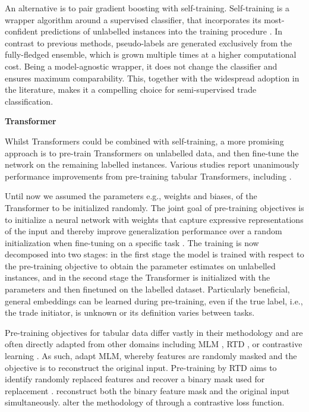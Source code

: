 An alternative is to pair gradient boosting with self-training. Self-training is a wrapper algorithm around a supervised classifier, that incorporates its most-confident predictions of unlabelled instances into the training procedure \autocite[][190]{yarowskyUnsupervisedWordSense1995}. In contrast to previous methods, pseudo-labels are generated exclusively from the fully-fledged ensemble, which is grown multiple times at a higher computational cost. Being a model-agnostic wrapper, it does not change the classifier and ensures maximum comparability. This, together with the widespread adoption in the literature, makes it a compelling choice for semi-supervised trade classification.

\textbf{Transformer}

Whilst Transformers could be combined with self-training, a more promising approach is to pre-train Transformers on unlabelled data, and then fine-tune the network on the remaining labelled instances. Various studies report unanimously performance improvements from pre-training tabular Transformers, including \textcites[][8]{somepalliSaintImprovedNeural2021}[][7]{huangTabTransformerTabularData2020}.

Until now we assumed the parameters e.g., weights and biases, of the Transformer to be initialized randomly. The joint goal of pre-training objectives is to initialize a neural network with weights that capture expressive representations of the input and thereby improve generalization performance over a random initialization when fine-tuning on a specific task \autocite[][12]{erhanWhyDoesUnsupervised}. The training is now decomposed into two stages: in the first stage the model is trained with respect to the pre-training objective to obtain the parameter estimates on unlabelled instances, and in the second stage the Transformer is initialized with the parameters and then finetuned on the labelled dataset. Particularly beneficial, general embeddings can be learned during pre-training, even if the true label, i.e., the trade initiator, is unknown or its definition varies between tasks.

Pre-training objectives for tabular data differ vastly in their methodology and are often directly adapted from other domains including \gls{MLM} \autocite[][4174]{devlinBERTPretrainingDeep2019}, \gls{RTD} \autocite[][1--3]{clarkElectraPretrainingText2020}, or contrastive learning \autocite[][2]{chenSimpleFrameworkContrastive2020}.
As such, \textcite[][7]{huangTabTransformerTabularData2020} adapt \gls{MLM}, whereby features are randomly masked and the objective is to reconstruct the original input. Pre-training by \gls{RTD} aims to identify randomly replaced features and recover a binary mask used for replacement \autocite[][7]{huangTabTransformerTabularData2020}. \textcites[][3]{bahriSCARFSelfsupervisedContrastive2022}[][4--5]{yoonVIMEExtendingSuccess2020} reconstruct both the binary feature mask and the original input simultaneously. \textcite[][3]{somepalliSaintImprovedNeural2021} alter the methodology of \textcite[][4--5]{yoonVIMEExtendingSuccess2020} through a contrastive loss function.

